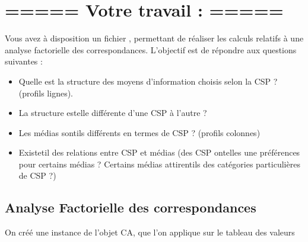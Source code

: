 \documentclass[letterpaper,10pt,french]{sphinxmanual}
\begin{document}
\section{===== Votre travail : =====}
\label{\detokenize{TP3_AFC_ACM:votre-travail}}
\sphinxAtStartPar
Vous avez à disposition un fichier , permettant de réaliser les calculs relatifs à une analyse factorielle des correspondances. L’objectif est de répondre aux questions suivantes :
\begin{itemize}
\item {} 
\sphinxAtStartPar
Quelle est la structure des moyens d’information choisis selon la CSP ? (profils lignes).

\item {} 
\sphinxAtStartPar
La structure est\sphinxhyphen{}elle différente d’une CSP à l’autre ?

\item {} 
\sphinxAtStartPar
Les médias sont\sphinxhyphen{}ils différents en termes de CSP ? (profils colonnes)

\item {} 
\sphinxAtStartPar
Existe\sphinxhyphen{}t\sphinxhyphen{}il des relations entre CSP et médias  (des CSP ont\sphinxhyphen{}elles une préférences pour certains médias ? Certains médias attirent\sphinxhyphen{}ils des catégories particulières de CSP ?)

\end{itemize}


\subsection{Analyse Factorielle des correspondances}
\label{\detokenize{TP3_AFC_ACM:analyse-factorielle-des-correspondances}}
\sphinxAtStartPar
On créé une instance de l’objet CA, que l’on applique sur le tableau des valeurs
\end{document}
